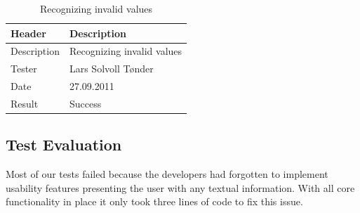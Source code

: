 \begin{table}[!htb] \footnotesize \center
\caption{Supporting \gls{define} and \gls{if} \label{tab:sp1_tid05}}
\noindent{}
\end{table}

\begin{table}[!htb] \footnotesize \center
\caption{Supporting configuration files \label{tab:sp1_tid06}}
\noindent{}
\end{table}

\begin{table}[!htb] \footnotesize \center
\caption{Recognizing invalid values \label{tab:sp1_tid07}}
\begin{tabular}{l l}
	\toprule
	Header & Description \\
	\midrule
	Description &  Recognizing invalid values  \\
	Tester & Lars Solvoll Tønder \\
	Date & 27.09.2011 \\
	Result & Success\\
	\bottomrule
\end{tabular}
\end{table}

\subsection{Test Evaluation}
Most of our tests failed because the developers had forgotten to implement
usability features presenting the user with any textual information. With all
core functionality in place it only took three lines of code to fix this issue.


